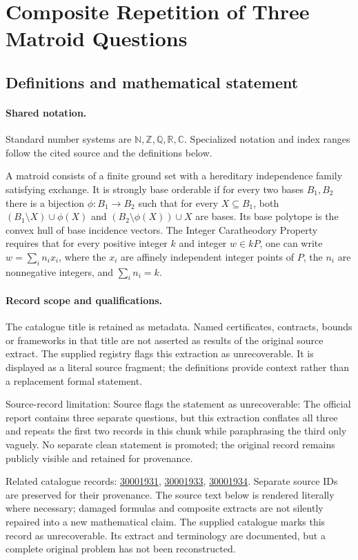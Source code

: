 \documentclass[11pt]{article}
\begin{document}
\section{Composite Repetition of Three Matroid Questions}\label{statement}

\subsection{Definitions and mathematical statement}

\paragraph{Shared notation.}Standard number systems are $\mathbb N,\mathbb Z,\mathbb Q,\mathbb R,\mathbb C$. Specialized notation and index ranges follow the cited source and the definitions below.


A matroid consists of a finite ground set with a hereditary independence family satisfying exchange. It is strongly base orderable if for every two bases $B_1,B_2$ there is a bijection $\phi:B_1\to B_2$ such that for every $X\subseteq B_1$, both $(B_1\setminus X)\cup\phi(X)$ and $(B_2\setminus\phi(X))\cup X$ are bases. Its base polytope is the convex hull of base incidence vectors. The Integer Caratheodory Property requires that for every positive integer $k$ and integer $w\in kP$, one can write $w=\sum_i n_ix_i$, where the $x_i$ are affinely independent integer points of $P$, the $n_i$ are nonnegative integers, and $\sum_i n_i=k$.
\paragraph{Record scope and qualifications.}
The catalogue title is retained as metadata. Named certificates, contracts, bounds or frameworks in that title are not asserted as results of the original source extract.
The supplied registry flags this extraction as unrecoverable. It is displayed as a literal source fragment; the definitions provide context rather than a replacement formal statement.

Source-record limitation: Source flags the statement as unrecoverable: The official report contains three separate questions, but this extraction conflates all three and repeats the first two records in this chunk while paraphrasing the third only vaguely. No separate clean statement is promoted; the original record remains publicly visible and retained for provenance.

Related catalogue records: \href{https://mehmetmars7.github.io/Erdosproblems-llm-hunter/problem.html?type=open_problems&id=30001931}{30001931}, \href{https://mehmetmars7.github.io/Erdosproblems-llm-hunter/problem.html?type=open_problems&id=30001933}{30001933}, \href{https://mehmetmars7.github.io/Erdosproblems-llm-hunter/problem.html?type=open_problems&id=30001934}{30001934}. Separate source IDs are preserved for their provenance.
The source text below is rendered literally where necessary; damaged formulas and composite extracts are not silently repaired into a new mathematical claim.
The supplied catalogue marks this record as unrecoverable. Its extract and terminology are documented, but a complete original problem has not been reconstructed.
\end{document}
